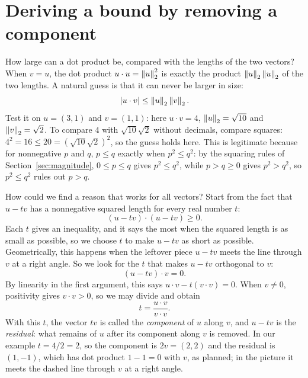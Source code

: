 \section{Deriving a bound by removing a component}\label{ch10:sec:cs}
How large can a dot product be, compared with the lengths of the two vectors? When $v=u$, the dot product $u\cdot u=\left\|u\right\|_2^2$ is exactly the product $\left\|u\right\|_2\left\|u\right\|_2$ of the two lengths. A natural guess is that it can never be larger in size:
\[
|u\cdot v|\le\left\|u\right\|_2\left\|v\right\|_2.
\]
Test it on $u=(3,1)$ and $v=(1,1)$: here $u\cdot v=4$, $\left\|u\right\|_2=\sqrt{10}$ and $\left\|v\right\|_2=\sqrt2$. To compare $4$ with $\sqrt{10}\sqrt2$ without decimals, compare squares: $4^2=16\le20=(\sqrt{10}\sqrt2)^2$, so the guess holds here. This is legitimate because for nonnegative $p$ and $q$, $p\le q$ exactly when $p^2\le q^2$: by the squaring rules of Section~\ref{sec:magnitude}, $0\le p\le q$ gives $p^2\le q^2$, while $p>q\ge0$ gives $p^2>q^2$, so $p^2\le q^2$ rules out $p>q$.

How could we find a reason that works for all vectors? Start from the fact that $u-tv$ has a nonnegative squared length for every real number $t$:
\[
(u-tv)\cdot(u-tv)\ge0.
\]
Each $t$ gives an inequality, and it says the most when the squared length is as small as possible, so we choose $t$ to make $u-tv$ as short as possible. Geometrically, this happens when the leftover piece $u-tv$ meets the line through $v$ at a right angle. So we look for the $t$ that makes $u-tv$ orthogonal to $v$:
\[
(u-tv)\cdot v=0.
\]
By linearity in the first argument, this says $u\cdot v-t(v\cdot v)=0$. When $v\ne0$, positivity gives $v\cdot v>0$, so we may divide and obtain
\[
t=\frac{u\cdot v}{v\cdot v}.
\]
With this $t$, the vector $tv$ is called the \emph{component} of $u$ along $v$, and $u-tv$ is the \emph{residual}: what remains of $u$ after its component along $v$ is removed. In our example $t=4/2=2$, so the component is $2v=(2,2)$ and the residual is $(1,-1)$, which has dot product $1-1=0$ with $v$, as planned; in the picture it meets the dashed line through $v$ at a right angle.

\begin{center}
\end{center}

